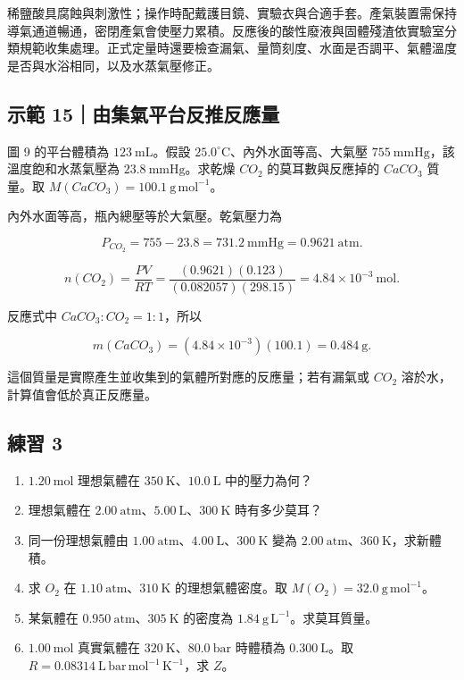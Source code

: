 \documentclass[11pt,a4paper]{article}
\providecommand{\tightlist}{%
  \setlength{\itemsep}{0pt}\setlength{\parskip}{0pt}}
\begin{document}
稀鹽酸具腐蝕與刺激性；操作時配戴護目鏡、實驗衣與合適手套。產氣裝置需保持導氣通道暢通，密閉產氣會使壓力累積。反應後的酸性廢液與固體殘渣依實驗室分類規範收集處理。正式定量時還要檢查漏氣、量筒刻度、水面是否調平、氣體溫度是否與水浴相同，以及水蒸氣壓修正。

\begin{HandoutWorkedExample}

\subsection{示範 15｜由集氣平台反推反應量}\label{ux793aux7bc4-15ux7531ux96c6ux6c23ux5e73ux53f0ux53cdux63a8ux53cdux61c9ux91cf}

圖 9 的平台體積為 \(123\ \mathrm{mL}\)。假設 \(25.0^\circ\mathrm C\)、內外水面等高、大氣壓 \(755\ \mathrm{mmHg}\)，該溫度飽和水蒸氣壓為 \(23.8\ \mathrm{mmHg}\)。求乾燥 \(CO_2\) 的莫耳數與反應掉的 \(CaCO_3\) 質量。取 \(M(CaCO_3)=100.1\ \mathrm{g\,mol^{-1}}\)。

內外水面等高，瓶內總壓等於大氣壓。乾氣壓力為

\[
P_{CO_2}=755-23.8=731.2\ \mathrm{mmHg}
=0.9621\ \mathrm{atm}.
\]

\[
n(CO_2)=\frac{PV}{RT}
=\frac{(0.9621)(0.123)}{(0.082057)(298.15)}
=4.84\times10^{-3}\ \mathrm{mol}.
\]

反應式中 \(CaCO_3:CO_2=1:1\)，所以

\[
m(CaCO_3)=(4.84\times10^{-3})(100.1)=0.484\ \mathrm g.
\]

這個質量是實際產生並收集到的氣體所對應的反應量；若有漏氣或 \(CO_2\) 溶於水，計算值會低於真正反應量。

\end{HandoutWorkedExample}

\subsection{練習 3}\label{ux7df4ux7fd2-3}

\begin{enumerate}
\def\labelenumi{\arabic{enumi}.}
\tightlist
\item
  \(1.20\ \mathrm{mol}\) 理想氣體在 \(350\ \mathrm K\)、\(10.0\ \mathrm L\) 中的壓力為何？
\item
  理想氣體在 \(2.00\ \mathrm{atm}\)、\(5.00\ \mathrm L\)、\(300\ \mathrm K\) 時有多少莫耳？
\item
  同一份理想氣體由 \(1.00\ \mathrm{atm}\)、\(4.00\ \mathrm L\)、\(300\ \mathrm K\) 變為 \(2.00\ \mathrm{atm}\)、\(360\ \mathrm K\)，求新體積。
\item
  求 \(O_2\) 在 \(1.10\ \mathrm{atm}\)、\(310\ \mathrm K\) 的理想氣體密度。取 \(M(O_2)=32.0\ \mathrm{g\,mol^{-1}}\)。
\item
  某氣體在 \(0.950\ \mathrm{atm}\)、\(305\ \mathrm K\) 的密度為 \(1.84\ \mathrm{g\,L^{-1}}\)。求莫耳質量。
\item
  \(1.00\ \mathrm{mol}\) 真實氣體在 \(320\ \mathrm K\)、\(80.0\ \mathrm{bar}\) 時體積為 \(0.300\ \mathrm L\)。取 \(R=0.08314\ \mathrm{L\,bar\,mol^{-1}\,K^{-1}}\)，求 \(Z\)。
\end{enumerate}
\end{document}
